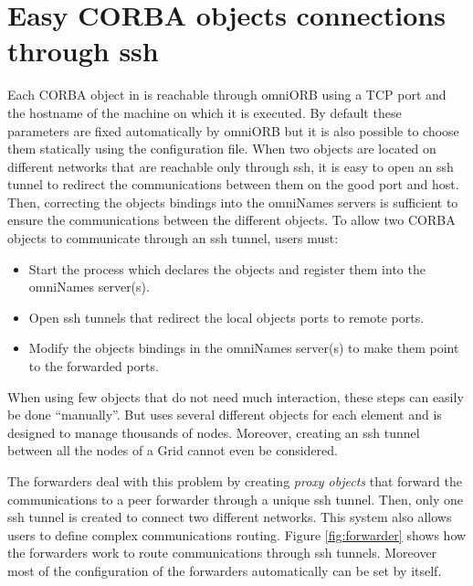 \section{Easy CORBA objects connections through ssh}
Each CORBA object in \diet is reachable through omniORB using a TCP
port and the hostname of the machine on which it is executed. By
default these parameters are fixed automatically by omniORB but it is
also possible to choose them statically using the \diet configuration
file.
When two objects are located on different networks that are reachable
only through ssh, it is easy to open an ssh tunnel to redirect the
communications between them on the good port and host. Then, correcting
the objects bindings into the omniNames servers is sufficient to ensure
the communications between the different objects. To allow two
CORBA objects to communicate through an ssh tunnel, users must:
\begin{itemize}
\item Start the process which declares the objects and register them
  into the omniNames server(s).
\item Open ssh tunnels that redirect the local objects ports to
  remote ports.
\item Modify the objects bindings in the omniNames server(s) to make
  them point to the forwarded ports.
\end{itemize}

When using few objects that do not need much interaction, these steps
can easily be done ``manually''. But \diet uses several different
objects for each element and is designed to manage thousands of nodes.
Moreover, creating an ssh tunnel between all the nodes of a Grid
cannot even be considered.

The \diet forwarders deal with this problem by creating \textit{proxy
  objects} that forward the communications to a peer forwarder through
a unique ssh tunnel. Then, only one ssh tunnel is created to connect
two different networks. This system also allows users to define complex
communications routing. Figure \ref{fig:forwarder} shows how the \diet
forwarders work to route communications through ssh tunnels. Moreover
most of the configuration of the forwarders automatically can be set
by \diet itself.


